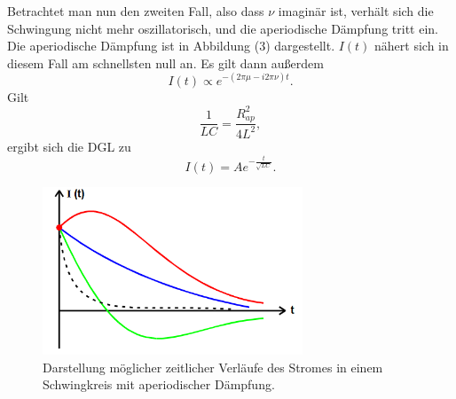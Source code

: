 \noindent Betrachtet man nun den zweiten Fall, also dass $\nu$ imaginär ist, verhält sich die Schwingung nicht mehr oszillatorisch, und die aperiodische Dämpfung tritt ein.
Die aperiodische Dämpfung ist in Abbildung (3) dargestellt. $I(t)$ nähert sich in diesem Fall am schnellsten null an.
Es gilt dann außerdem
\begin{equation}
I(t) \propto e^{-(2\pi \mu - i2\pi \nu)t} .
\end{equation}
Gilt
\begin{equation}
\frac{1}{LC} = \frac{R_{ap}^2}{4L^2} ,
\end{equation}
ergibt sich die DGL zu
\begin{equation}
I(t) = A e^{-\frac{t}{\sqrt{LC}}} .
\end{equation}
\begin{figure}[H]
  \centering
  \includegraphics[height=5cm]{aperiodisch.png}
  \caption{Darstellung möglicher zeitlicher Verläufe des Stromes in einem Schwingkreis mit aperiodischer Dämpfung. \cite[S.5]{kent}}
\end{figure}



